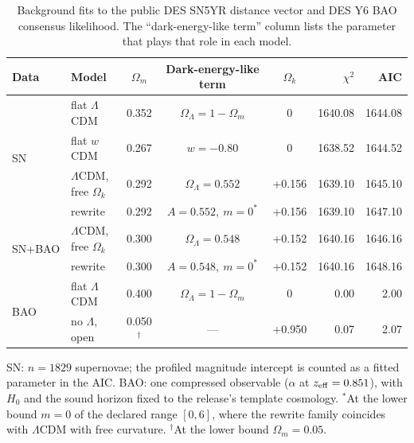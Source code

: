\begin{table}[t]
\centering
\small
\caption{Background fits to the public DES SN5YR distance vector and DES Y6 BAO consensus likelihood. The ``dark-energy-like term'' column lists the parameter that plays that role in each model.}
\label{tab:background_fits}
\begin{tabular}{@{}llcccrr@{}}
\toprule
Data & Model & $\Omega_m$ & Dark-energy-like term & $\Omega_k$ & $\chi^2$ & AIC \\
\midrule
\multirow{4}{*}{SN} & flat $\Lambda$CDM & 0.352 & $\Omega_\Lambda=1-\Omega_m$ & $0$ & 1640.08 & 1644.08 \\
 & flat $w$CDM & 0.267 & $w=-0.80$ & $0$ & 1638.52 & 1644.52 \\
 & $\Lambda$CDM, free $\Omega_k$ & 0.292 & $\Omega_\Lambda=0.552$ & +0.156 & 1639.10 & 1645.10 \\
 & rewrite & 0.292 & $A=0.552,\ m=0^{\ast}$ & +0.156 & 1639.10 & 1647.10 \\
\midrule
\multirow{2}{*}{SN+BAO} & $\Lambda$CDM, free $\Omega_k$ & 0.300 & $\Omega_\Lambda=0.548$ & +0.152 & 1640.16 & 1646.16 \\
 & rewrite & 0.300 & $A=0.548,\ m=0^{\ast}$ & +0.152 & 1640.16 & 1648.16 \\
\midrule
\multirow{2}{*}{BAO} & flat $\Lambda$CDM & 0.400 & $\Omega_\Lambda=1-\Omega_m$ & $0$ & 0.00 & 2.00 \\
 & no $\Lambda$, open & 0.050$^{\dagger}$ & --- & +0.950 & 0.07 & 2.07 \\
\bottomrule
\end{tabular}
\par\smallskip
\parbox{0.92\linewidth}{\footnotesize SN: $n=1829$ supernovae; the profiled magnitude intercept is counted as a fitted parameter in the AIC. BAO: one compressed observable ($\alpha$ at $z_{\rm eff}=0.851$), with $H_0$ and the sound horizon fixed to the release's template cosmology. $^{\ast}$At the lower bound $m=0$ of the declared range $[0,6]$, where the rewrite family coincides with $\Lambda$CDM with free curvature. $^{\dagger}$At the lower bound $\Omega_m=0.05$.}
\end{table}
